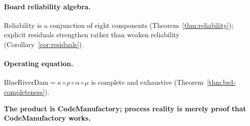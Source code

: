 \paragraph{Board reliability algebra.} Reliability is a conjunction of eight
components (Theorem~\ref{thm:reliability}); explicit residuals strengthen
rather than weaken reliability (Corollary~\ref{cor:residuals}).

\paragraph{Operating equation.} $\mathrm{BlueRiverDam} = \kappa \circ \rho
\circ \alpha \circ \mu$ is complete and exhaustive
(Theorem~\ref{thm:brd-completeness}).

\bigskip
\noindent\textbf{The product is CodeManufactory; process reality is merely
proof that CodeManufactory works.}
